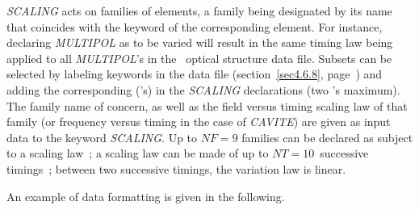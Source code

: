 \bigskip

\noindent\textsl{SCALING} acts on families of elements,  a family being
designated by its name that  coincides with 
the keyword of the corresponding element. For instance, declaring \textsl{MULTIPOL} 
as to be varied will result in the same timing law being applied to all 
\textsl{MULTIPOL}'s in the \zgou\ optical structure data file. Subsets can be selected by 
labeling keywords in the data file (section~\ref{sec4.6.8}, page~\pageref{sec4.6.8}) 
and adding the corresponding \LABEL('s) 
in the \textsl{SCALING} declarations (two \LABEL's maximum). The family name of concern, 
as well as the field versus timing scaling law of that 
family (or frequency versus timing in the case of \textsl{CAVITE}) are given as
input data to the keyword \textsl{SCALING}. Up to $NF = 9$ families can be declared
as subject to a scaling law~; a scaling law can be made of up to $NT = 10$~successive timings~; 
between two successive timings, the variation law is linear.  
\bigskip

\noindent An example of data formatting is given in the following. 

\bigskip

